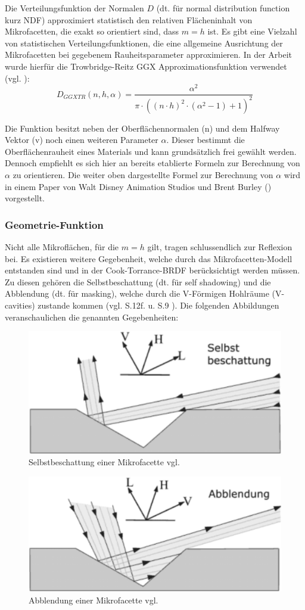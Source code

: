 \documentclass[
  11pt,
  a4paper,
  oneside
  ]{article}
\begin{document}
Die Verteilungsfunktion der Normalen $D$ (dt. für normal distribution function kurz NDF) approximiert statistisch den relativen Flächeninhalt von Mikrofacetten, die exakt so orientiert sind, dass $m = h$ ist. Es gibt eine Vielzahl von statistischen Verteilungsfunktionen, die eine allgemeine Ausrichtung der Mikrofacetten bei gegebenem Rauheitsparameter approximieren. In der Arbeit wurde hierfür die Trowbridge-Reitz GGX Approximationsfunktion verwendet (vgl. \cite{learnOpenGL}):
\begin{equation}
  D_{GGXTR}\left( n,h,\alpha \right) =\dfrac{\alpha ^{2}}{\pi \cdot \left( \left( n\cdot h\right) ^{2}\cdot \left( \alpha ^{2}-1\right) +1\right) ^{2}}
\end{equation}

Die Funktion besitzt neben der Oberflächennormalen (n) und dem Halfway Vektor (v) noch einen weiteren Parameter $\alpha$. Dieser bestimmt die Oberflächenrauheit eines Materials und kann grundsätzlich frei gewählt werden. Dennoch empfiehlt es sich hier an bereits etablierte Formeln zur Berechnung von $\alpha$ zu orientieren. Die weiter oben dargestellte Formel zur Berechnung von $\alpha$ wird in einem Paper von Walt Disney Animation Studios und Brent Burley (\cite{Burley2012PhysicallyBasedSA}) vorgestellt.
\subsubsection{Geometrie-Funktion}
Nicht alle Mikroflächen, für die $m = h$ gilt, tragen schlussendlich zur Reflexion bei. Es existieren weitere Gegebenheit, welche durch das Mikrofacetten-Modell entstanden sind und in der Cook-Torrance-BRDF berücksichtigt werden müssen. Zu diesen gehören die Selbstbeschattung (dt. für self shadowing) und die Abblendung (dt. für masking), welche durch die V-Förmigen Hohlräume (V-cavities) zustande kommen 
(vgl. S.12f. \cite{rtrPaper} u. S.9 \cite{irrlichtOrg}). Die folgenden Abbildungen veranschaulichen die genannten Gegebenheiten: 
\begin{figure}[H]
  \centering
  \includegraphics*[width=0.45 \textwidth]{images/selstbeschattung.png}
  \caption{Selbstbeschattung einer Mikrofacette vgl. \cite{learnOpenGL}}
  \label{fig:img8}
\end{figure}
\begin{figure}[H]
  \centering
  \includegraphics*[width=0.45 \textwidth]{images/abblendung.png}
  \caption{Abblendung einer Mikrofacette vgl. \cite{learnOpenGL}}
  \label{fig:img9}
\end{figure}
\end{document}
